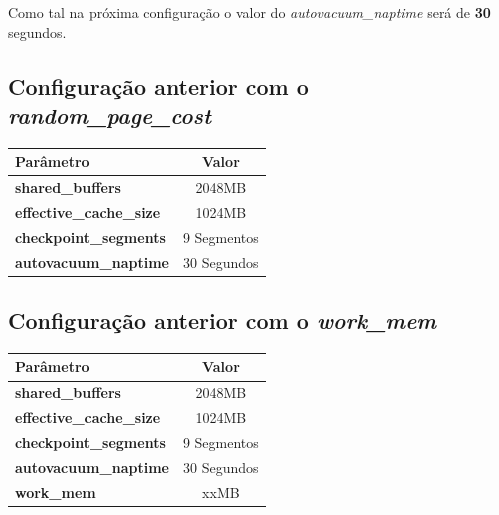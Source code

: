 Como tal na próxima configuração o valor do \textit{autovacuum\_naptime} será de \textbf{30} segundos.

\newpage

\subsection{Configuração anterior com o \textit{random\_page\_cost}}

\begin{table}[!h]
\center
\small
\begin{tabular}{|l|c|}
\hline
\textbf{Parâmetro} & \textbf{Valor} \\ \hline
\textbf{shared\_buffers} & 2048MB  \\ \hline
\textbf{effective\_cache\_size} & 1024MB  \\ \hline
\textbf{checkpoint\_segments} & 9 Segmentos \\ \hline
\textbf{autovacuum\_naptime} & 30 Segundos \\ \hline
\end{tabular}
\end{table}

\newpage

\subsection{Configuração anterior com o \textit{work\_mem}}

\begin{table}[!h]
\center
\small
\begin{tabular}{|l|c|}
\hline
\textbf{Parâmetro} & \textbf{Valor} \\ \hline
\textbf{shared\_buffers} & 2048MB  \\ \hline
\textbf{effective\_cache\_size} & 1024MB  \\ \hline
\textbf{checkpoint\_segments} & 9 Segmentos \\ \hline
\textbf{autovacuum\_naptime} & 30 Segundos \\ \hline
\textbf{work\_mem} & xxMB \\ \hline
\end{tabular}
\end{table}

